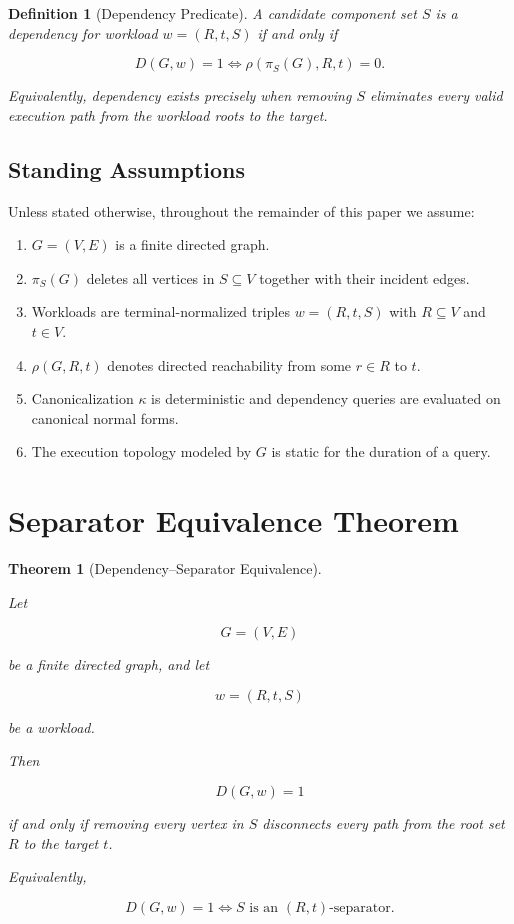 \documentclass[11pt]{article}
\newtheorem{definition}{Definition}
\newtheorem{theorem}{Theorem}
\begin{document}
\begin{definition}[Dependency Predicate]

A candidate component set \(S\) is a dependency for workload
\(w=(R,t,S)\) if and only if

\begin{equation}
\label{eq:dependency}
D(G,w)=1
\iff
\rho(\pi_S(G),R,t)=0.
\end{equation}

Equivalently, dependency exists precisely when removing \(S\)
eliminates every valid execution path from the workload roots to the
target.

\end{definition}
\subsection{Standing Assumptions}
Unless stated otherwise, throughout the remainder of this paper we assume:
\begin{enumerate}[label=(A\arabic*),leftmargin=*]
  \item $G=(V,E)$ is a finite directed graph.
  \item $\pi_S(G)$ deletes all vertices in $S\subseteq V$ together with their incident edges.
  \item Workloads are terminal-normalized triples $w=(R,t,S)$ with $R\subseteq V$ and $t\in V$.
  \item $\rho(G,R,t)$ denotes directed reachability from some $r\in R$ to $t$.
  \item Canonicalization $\kappa$ is deterministic and dependency queries are evaluated on canonical normal forms.
  \item The execution topology modeled by $G$ is static for the duration of a query.
\end{enumerate}

\section{Separator Equivalence Theorem}
\label{sec:separator}
\begin{theorem}[Dependency--Separator Equivalence]
\label{thm:separator}

Let

\[
G=(V,E)
\]

be a finite directed graph, and let

\[
w=(R,t,S)
\]

be a workload.

Then

\[
D(G,w)=1
\]

if and only if removing every vertex in \(S\) disconnects every path
from the root set \(R\) to the target \(t\).

Equivalently,

\[
D(G,w)=1
\iff
S
\text{ is an }(R,t)\text{-separator}.
\]

\end{theorem}
\end{document}
